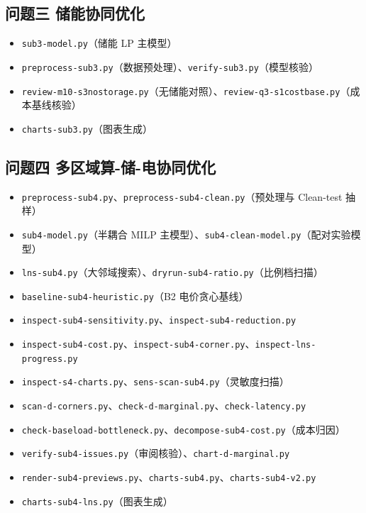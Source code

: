\subsection{问题三 储能协同优化}

\begin{itemize}
    \item \texttt{sub3-model.py}（储能 LP 主模型）
    \item \texttt{preprocess-sub3.py}（数据预处理）、\texttt{verify-sub3.py}（模型核验）
    \item \texttt{review-m10-s3nostorage.py}（无储能对照）、\texttt{review-q3-s1costbase.py}（成本基线核验）
    \item \texttt{charts-sub3.py}（图表生成）
\end{itemize}

\subsection{问题四 多区域算-储-电协同优化}

\begin{itemize}
    \item \texttt{preprocess-sub4.py}、\texttt{preprocess-sub4-clean.py}（预处理与 Clean-test 抽样）
    \item \texttt{sub4-model.py}（半耦合 MILP 主模型）、\texttt{sub4-clean-model.py}（配对实验模型）
    \item \texttt{lns-sub4.py}（大邻域搜索）、\texttt{dryrun-sub4-ratio.py}（比例档扫描）
    \item \texttt{baseline-sub4-heuristic.py}（B2 电价贪心基线）
    \item \texttt{inspect-sub4-sensitivity.py}、\texttt{inspect-sub4-reduction.py}
    \item \texttt{inspect-sub4-cost.py}、\texttt{inspect-sub4-corner.py}、\texttt{inspect-lns-progress.py}
    \item \texttt{inspect-s4-charts.py}、\texttt{sens-scan-sub4.py}（灵敏度扫描）
    \item \texttt{scan-d-corners.py}、\texttt{check-d-marginal.py}、\texttt{check-latency.py}
    \item \texttt{check-baseload-bottleneck.py}、\texttt{decompose-sub4-cost.py}（成本归因）
    \item \texttt{verify-sub4-issues.py}（审阅核验）、\texttt{chart-d-marginal.py}
    \item \texttt{render-sub4-previews.py}、\texttt{charts-sub4.py}、\texttt{charts-sub4-v2.py}
    \item \texttt{charts-sub4-lns.py}（图表生成）
\end{itemize}
\fussy


